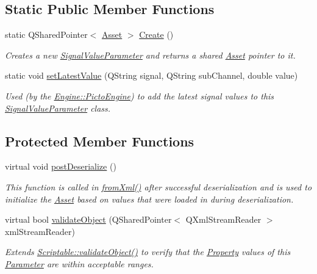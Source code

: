 \subsection*{Static Public Member Functions}
\begin{DoxyCompactItemize}
\item 
\hypertarget{class_picto_1_1_signal_value_parameter_a978e756ecd9e7db63eac43ac55b4d0b1}{static Q\-Shared\-Pointer$<$ \hyperlink{class_picto_1_1_asset}{Asset} $>$ \hyperlink{class_picto_1_1_signal_value_parameter_a978e756ecd9e7db63eac43ac55b4d0b1}{Create} ()}\label{class_picto_1_1_signal_value_parameter_a978e756ecd9e7db63eac43ac55b4d0b1}

\begin{DoxyCompactList}\small\item\em Creates a new \hyperlink{class_picto_1_1_signal_value_parameter}{Signal\-Value\-Parameter} and returns a shared \hyperlink{class_picto_1_1_asset}{Asset} pointer to it. \end{DoxyCompactList}\item 
static void \hyperlink{class_picto_1_1_signal_value_parameter_af9b2ee3a6b6b95b741b64f0a2b13efd0}{set\-Latest\-Value} (Q\-String signal, Q\-String sub\-Channel, double value)
\begin{DoxyCompactList}\small\item\em Used (by the \hyperlink{class_picto_1_1_engine_1_1_picto_engine}{Engine\-::\-Picto\-Engine}) to add the latest signal values to this \hyperlink{class_picto_1_1_signal_value_parameter}{Signal\-Value\-Parameter} class. \end{DoxyCompactList}\end{DoxyCompactItemize}
\subsection*{Protected Member Functions}
\begin{DoxyCompactItemize}
\item 
virtual void \hyperlink{class_picto_1_1_signal_value_parameter_acedeba8e307f25ffa1dc2f4feaa1de09}{post\-Deserialize} ()
\begin{DoxyCompactList}\small\item\em This function is called in \hyperlink{class_picto_1_1_asset_a8bed4da09ecb1c07ce0dab313a9aba67}{from\-Xml()} after successful deserialization and is used to initialize the \hyperlink{class_picto_1_1_asset}{Asset} based on values that were loaded in during deserialization. \end{DoxyCompactList}\item 
virtual bool \hyperlink{class_picto_1_1_signal_value_parameter_ad04878f10c4ed0960ccf3ea89dd99fe4}{validate\-Object} (Q\-Shared\-Pointer$<$ Q\-Xml\-Stream\-Reader $>$ xml\-Stream\-Reader)
\begin{DoxyCompactList}\small\item\em Extends \hyperlink{class_picto_1_1_scriptable_ab6e2944c43a3b5d418bf7b251594386d}{Scriptable\-::validate\-Object()} to verify that the \hyperlink{class_picto_1_1_property}{Property} values of this \hyperlink{class_picto_1_1_parameter}{Parameter} are within acceptable ranges. \end{DoxyCompactList}\end{DoxyCompactItemize}
